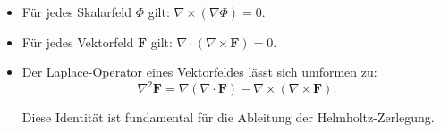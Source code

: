 \begin{itemize}
\item Für jedes Skalarfeld $\Phi$ gilt: $\nabla \times (\nabla \Phi) = 0$.
\item Für jedes Vektorfeld $\mathbf{F}$ gilt: $\nabla \cdot (\nabla \times \mathbf{F}) = 0$.
\item Der Laplace-Operator eines Vektorfeldes lässt sich umformen zu:
\begin{equation}
\nabla^2 \mathbf{F} = \nabla(\nabla \cdot \mathbf{F}) - \nabla \times (\nabla \times \mathbf{F}).
\end{equation}

\noindent Diese Identität ist fundamental für die Ableitung der Helmholtz-Zerlegung.
\end{itemize}




